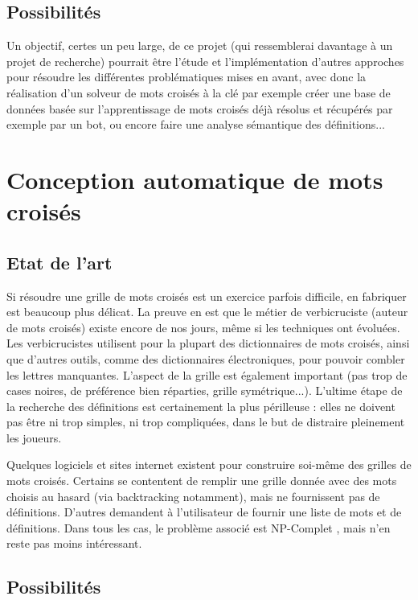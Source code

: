\documentclass{article}
\begin{document}
\subsection{Possibilités}

Un objectif, certes un peu large, de ce projet (qui ressemblerai davantage à un projet de recherche) pourrait être l'étude et l'implémentation d'autres approches pour résoudre les différentes problématiques mises en avant, avec donc la réalisation d'un solveur de mots croisés à la clé par exemple créer une base de données basée sur l'apprentissage de mots croisés déjà résolus et récupérés par exemple par un bot, ou encore faire une analyse sémantique des définitions...

\section{Conception automatique de mots croisés}

\subsection{Etat de l'art}

Si résoudre une grille de mots croisés est un exercice parfois difficile, en fabriquer est beaucoup plus délicat. La preuve en est que le métier de verbicruciste (auteur de mots croisés) existe encore de nos jours, même si les techniques ont évoluées. Les verbicrucistes utilisent pour la plupart des dictionnaires de mots croisés, ainsi que d'autres outils, comme des dictionnaires électroniques, pour pouvoir combler les lettres manquantes. L'aspect de la grille est également important (pas trop de cases noires, de préférence bien réparties, grille symétrique...). L'ultime étape de la recherche des définitions est certainement la plus périlleuse : elles ne doivent pas être ni trop simples, ni trop compliquées, dans le but de distraire pleinement les joueurs.

Quelques logiciels et sites internet existent pour construire soi-même des grilles de mots croisés. Certains se contentent de remplir une grille donnée avec des mots choisis au hasard (via backtracking notamment), mais ne fournissent pas de définitions. D'autres demandent à l'utilisateur de fournir une liste de mots et de définitions. Dans tous les cas, le problème associé est NP-Complet \cite{NP-complete}, mais n'en reste pas moins intéressant.

\subsection{Possibilités}
\end{document}
